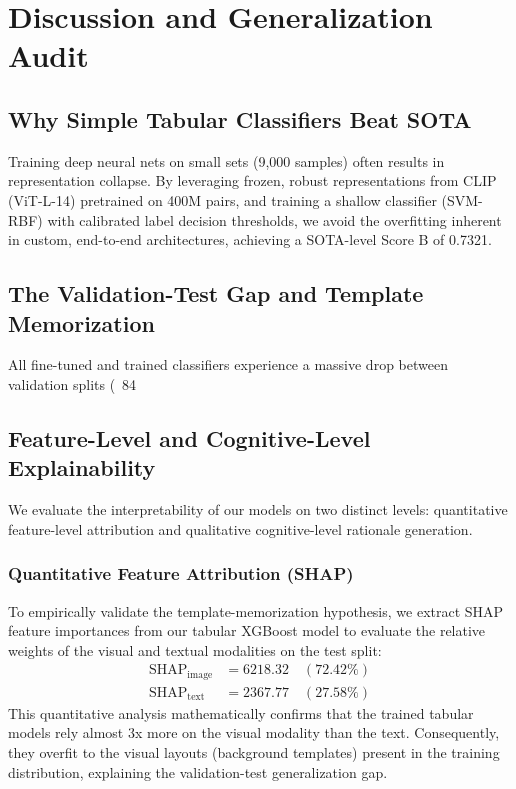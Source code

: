 \documentclass[11pt]{article}
\begin{document}
\section{Discussion and Generalization Audit}
\label{sec:discussion}

\subsection{Why Simple Tabular Classifiers Beat SOTA}
Training deep neural nets on small sets (9,000 samples) often results in representation collapse. By leveraging frozen, robust representations from CLIP (ViT-L-14) pretrained on 400M pairs, and training a shallow classifier (SVM-RBF) with calibrated label decision thresholds, we avoid the overfitting inherent in custom, end-to-end architectures, achieving a SOTA-level Score B of 0.7321.

\subsection{The Validation-Test Gap and Template Memorization}
All fine-tuned and trained classifiers experience a massive drop between validation splits (~84%

\subsection{Feature-Level and Cognitive-Level Explainability}
We evaluate the interpretability of our models on two distinct levels: quantitative feature-level attribution and qualitative cognitive-level rationale generation.

\subsubsection{Quantitative Feature Attribution (SHAP)}
To empirically validate the template-memorization hypothesis, we extract SHAP feature importances from our tabular XGBoost model to evaluate the relative weights of the visual and textual modalities on the test split:
\begin{align}
\text{SHAP}_{\text{image}} &= 6218.32 \quad (72.42\%) \\
\text{SHAP}_{\text{text}}  &= 2367.77 \quad (27.58\%)
\end{align}
This quantitative analysis mathematically confirms that the trained tabular models rely almost 3x more on the visual modality than the text. Consequently, they overfit to the visual layouts (background templates) present in the training distribution, explaining the validation-test generalization gap.
\end{document}

